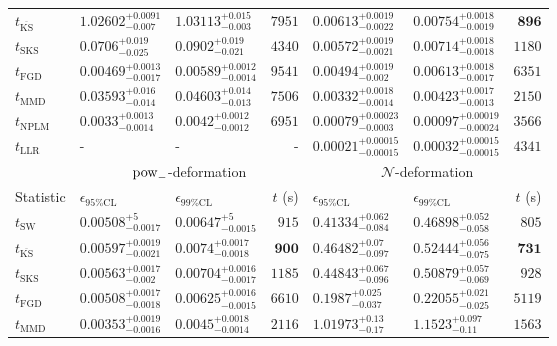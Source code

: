\begin{tabular}{l|llr|llr}
	$t_{\overline{\mathrm{KS}}}$ & $1.02602_{-0.007}^{+0.0091}$ & $1.03113_{-0.003}^{+0.015}$ & $7951$ & $0.00613_{-0.0022}^{+0.0019}$ & $0.00754_{-0.0019}^{+0.0018}$ & ${\mathbf{896}}$ \\
	$t_{\mathrm{SKS}}$ & $0.0706_{-0.025}^{+0.019}$ & $0.0902_{-0.021}^{+0.019}$ & $4340$ & $0.00572_{-0.0021}^{+0.0019}$ & $0.00714_{-0.0018}^{+0.0018}$ & $1180$ \\
	$t_{\mathrm{FGD}}$ & ${\mathbf{0.00469_{-0.0017}^{+0.0013}}}$ & ${\mathbf{0.00589_{-0.0014}^{+0.0012}}}$ & $9541$ & $0.00494_{-0.002}^{+0.0019}$ & $0.00613_{-0.0017}^{+0.0018}$ & $6351$ \\
	$t_{\mathrm{MMD}}$ & $0.03593_{-0.014}^{+0.016}$ & $0.04603_{-0.013}^{+0.014}$ & $7506$ & ${\mathbf{0.00332_{-0.0014}^{+0.0018}}}$ & ${\mathbf{0.00423_{-0.0013}^{+0.0017}}}$ & $2150$ \\
\rowcolor{red!35}	$t_{\mathrm{NPLM}}$ & $0.0033_{-0.0014}^{+0.0013}$ & $0.0042_{-0.0012}^{+0.0012}$ & $6951$ & $0.00079_{-0.0003}^{+0.00023}$ & $0.00097_{-0.00024}^{+0.00019}$ & $3566$ \\
	$t_{\mathrm{LLR}}$ & - & - & - & $0.00021_{-0.00015}^{+0.00015}$ & $0.00032_{-0.00015}^{+0.00015}$ & $4341$ \\
	\toprule
	\multicolumn{1}{c}{} & \multicolumn{3}{c}{$\rm{pow}_{-}$-deformation} & \multicolumn{3}{c}{$\mathcal{N}$-deformation} \\
	Statistic & $\epsilon_{95\%\mathrm{CL}}$ & $\epsilon_{99\%\mathrm{CL}}$ & $t$ (s) & $\epsilon_{95\%\mathrm{CL}}$ & $\epsilon_{99\%\mathrm{CL}}$ & $t$ (s) \\
	\midrule
	$t_{\mathrm{SW}}$ & $0.00508_{-0.0017}^{+5}$ & $0.00647_{-0.0015}^{+5}$ & $915$ & $0.41334_{-0.084}^{+0.062}$ & $0.46898_{-0.058}^{+0.052}$ & $805$ \\
	$t_{\overline{\mathrm{KS}}}$ & $0.00597_{-0.0021}^{+0.0019}$ & $0.0074_{-0.0018}^{+0.0017}$ & ${\mathbf{900}}$ & $0.46482_{-0.097}^{+0.07}$ & $0.52444_{-0.075}^{+0.056}$ & ${\mathbf{731}}$ \\
	$t_{\mathrm{SKS}}$ & $0.00563_{-0.002}^{+0.0017}$ & $0.00704_{-0.0017}^{+0.0016}$ & $1185$ & $0.44843_{-0.096}^{+0.067}$ & $0.50879_{-0.069}^{+0.057}$ & $928$ \\
	$t_{\mathrm{FGD}}$ & $0.00508_{-0.0018}^{+0.0017}$ & $0.00625_{-0.0015}^{+0.0016}$ & $6610$ & ${\mathbf{0.1987_{-0.037}^{+0.025}}}$ & ${\mathbf{0.22055_{-0.025}^{+0.021}}}$ & $5119$ \\
	$t_{\mathrm{MMD}}$ & ${\mathbf{0.00353_{-0.0016}^{+0.0019}}}$ & ${\mathbf{0.0045_{-0.0014}^{+0.0018}}}$ & $2116$ & $1.01973_{-0.17}^{+0.13}$ & $1.1523_{-0.11}^{+0.097}$ & $1563$ \\

\end{tabular}
